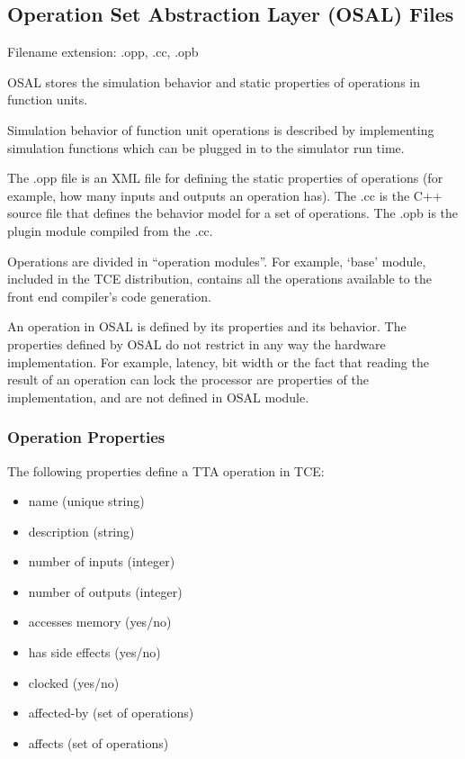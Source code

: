 \documentclass[twoside]{tceusermanual}
\begin{document}
\subsection{Operation Set Abstraction Layer (OSAL) Files}
\label{section:osal}
Filename extension: .opp, .cc, .opb

OSAL stores the simulation behavior and static properties of operations in
function units.

Simulation behavior of function unit operations is described by implementing
simulation functions which can be plugged in to the simulator run time.

The .opp file is an XML file for defining the static properties of
operations (for example, how many inputs and outputs an operation has). The
.cc is the C++ source file that defines the behavior model for a set of
operations. The .opb is the plugin module compiled from the .cc.

Operations are divided in ``operation modules''. For example, `base' module,
included in the TCE distribution, contains all the operations available 
to the front end compiler's code generation.

An operation in OSAL is defined by its properties
and its behavior.  The properties defined by OSAL do not restrict in any
way the hardware implementation.  For example, latency, bit width or the
fact that reading the result of an operation can lock the processor are
properties of the implementation, and are not defined in OSAL module.

\subsubsection{Operation Properties}
\label{ssec:operation-properties}

The following properties define a TTA operation in TCE:

\begin{itemize}
\item name (unique string)
\item description (string)
\item number of inputs (integer)
\item number of outputs (integer)
\item accesses memory (yes/no)
\item has side effects (yes/no)
\item clocked (yes/no)
\item affected-by (set of operations)
\item affects (set of operations)
\end{itemize}
\end{document}
